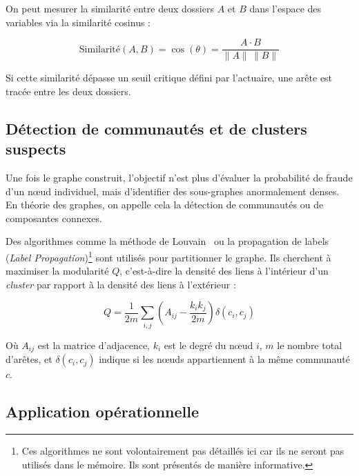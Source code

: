 On peut mesurer la similarité entre deux dossiers $A$ et $B$ dans l'espace des variables via la similarité cosinus :

\begin{equation}
    \text{Similarité}(A,B) = \cos(\theta) = \frac{A \cdot B}{\lVert A \rVert \, \lVert B \rVert}
\end{equation}

Si cette similarité dépasse un seuil critique défini par l'actuaire, une arête est tracée entre les deux dossiers.

\subsection{Détection de communautés et de clusters suspects}

Une fois le graphe construit, l'objectif n'est plus d'évaluer la probabilité de fraude d'un nœud individuel, mais d'identifier des sous-graphes anormalement denses. En théorie des graphes, on appelle cela la détection de communautés ou de composantes connexes.

Des algorithmes comme la méthode de Louvain~\cite{blondel_louvain} ou la propagation de labels (\textit{Label Propagation})\footnote{Ces algorithmes ne sont volontairement pas détaillés ici car ils ne seront pas utilisés dans le mémoire. Ils sont présentés de manière informative.} sont utilisés pour partitionner le graphe. Ils cherchent à maximiser la modularité $Q$, c'est-à-dire la densité des liens à l'intérieur d'un \textit{cluster} par rapport à la densité des liens à l'extérieur :

\begin{equation}
    Q = \frac{1}{2m} \sum_{i,j} \left( A_{ij} - \frac{k_i k_j}{2m} \right) \delta(c_i, c_j)
\end{equation}

Où $A_{ij}$ est la matrice d'adjacence, $k_i$ est le degré du nœud $i$, $m$ le nombre total d'arêtes, et $\delta(c_i, c_j)$ indique si les nœuds appartiennent à la même communauté $c$.

\subsection{Application opérationnelle}

